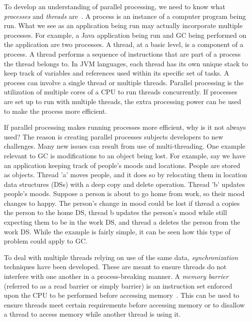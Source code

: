 \documentclass{sig-alternate}
\begin{document}
To develop an understanding of parallel processing, we need to know 
what \emph{processes} and \emph{threads} are~\cite{oracle:threads}.
A process is an instance of a computer program being run. What we
see as an application being run may actually incorporate multiple processes.
For example, a Java application being run and GC being performed on the application are two processes.
A thread, at a basic level, is a component of a process. A thread performs a sequence
of instructions that are part of a process the thread belongs to. In JVM languages,
each thread has its own unique stack to keep track of variables
and references used within its specific set of tasks. A process
can involve a single thread or multiple threads.
Parallel processing is the utilization of multiple
cores of a CPU to run threads concurrently. If processes are set up
to run with multiple threads, the extra processing power can be used to make 
the process more efficient.

If parallel processing makes running processes more efficient, why is it not
always used? The reason is creating parallel processes subjects
developers to new challenges. Many new issues can result from use of
multi-threading. One example relevant to GC is modifications to an 
object being lost. For example, say we have an application keeping 
track of people's moods and locations. People are stored as objects. 
Thread 'a' moves people, and it does so by relocating them in location data structures (DSs) 
with a deep copy and delete operation. Thread 'b' updates people's moods. Suppose a person
is about to go home from work, so their mood changes to happy.
The person's change in mood could be lost if thread a copies the person
to the home DS, thread b updates the person's mood while still expecting
them to be in the work DS, and thread a deletes the person from the work DS. 
While the example is fairly simple, it can be seen how this type of problem
could apply to GC.

To deal with multiple threads relying on use of the same data, \emph{synchronization}
techniques have been developed. These are meant to ensure threads do not interfere
with one another in a process-breaking manner. A \emph{memory barrier} (referred to 
as a read barrier or simply barrier) is an instruction set enforced upon the 
CPU to be performed before accessing memory~\cite{wiki:barrier}. This can be used to ensure threads
meet certain requirements before accessing memory or to disallow a thread to
access memory while another thread is using it.
 
\end{document}
